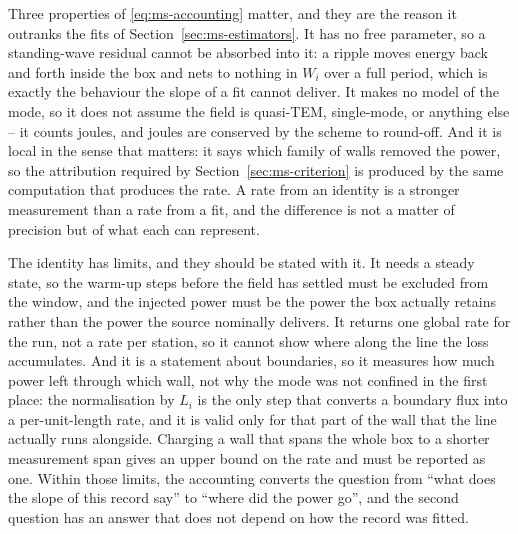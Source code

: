 Three properties of \eqref{eq:ms-accounting} matter, and they are the reason it outranks the fits of
Section~\ref{sec:ms-estimators}. It has no free parameter, so a standing-wave residual cannot be absorbed into
it: a ripple moves energy back and forth inside the box and nets to nothing in $W_i$ over a full period, which
is exactly the behaviour the slope of a fit cannot deliver. It makes no model of the mode, so it does not
assume the field is quasi-TEM, single-mode, or anything else -- it counts joules, and joules are conserved by
the scheme to round-off. And it is local in the sense that matters: it says which family of walls removed the
power, so the attribution required by Section~\ref{sec:ms-criterion} is produced by the same computation that
produces the rate. A rate from an identity is a stronger measurement than a rate from a fit, and the
difference is not a matter of precision but of what each can represent.

The identity has limits, and they should be stated with it. It needs a steady state, so the warm-up steps
before the field has settled must be excluded from the window, and the injected power must be the power the
box actually retains rather than the power the source nominally delivers. It returns one global rate for the
run, not a rate per station, so it cannot show where along the line the loss accumulates. And it is a
statement about boundaries, so it measures how much power left through which wall, not why the mode was not
confined in the first place: the normalisation by $L_i$ is the only step that converts a boundary flux into a
per-unit-length rate, and it is valid only for that part of the wall that the line actually runs alongside.
Charging a wall that spans the whole box to a shorter measurement span gives an upper bound on the rate and
must be reported as one. Within those limits, the accounting converts the question from ``what does the slope
of this record say'' to ``where did the power go'', and the second question has an answer that does not depend
on how the record was fitted.
